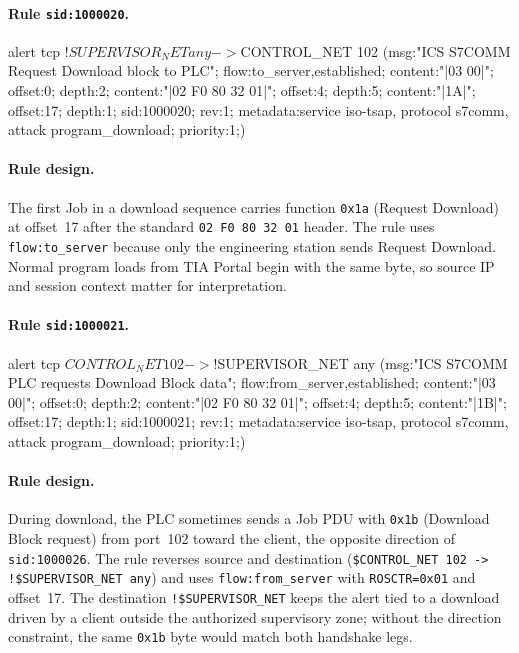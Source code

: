 \documentclass[../main.tex]{subfiles}
\begin{document}
\paragraph{Rule \texttt{sid:1000020}.}
\begin{packetdump}
alert tcp !$SUPERVISOR_NET any -> $CONTROL_NET 102 (msg:"ICS S7COMM Request Download block to PLC";
  flow:to_server,established; content:"|03 00|"; offset:0; depth:2;
  content:"|02 F0 80 32 01|"; offset:4; depth:5; content:"|1A|";
  offset:17; depth:1; sid:1000020; rev:1;
  metadata:service iso-tsap, protocol s7comm, attack program_download; priority:1;)
\end{packetdump}

\paragraph{Rule design.}
The first Job in a download sequence carries function \texttt{0x1a} (Request Download) at offset~17 after the standard \texttt{02 F0 80 32 01} header. The rule uses \texttt{flow:to\_server} because only the engineering station sends Request Download. Normal program loads from TIA Portal begin with the same byte, so source IP and session context matter for interpretation.

\paragraph{Rule \texttt{sid:1000021}.}
\begin{packetdump}
alert tcp $CONTROL_NET 102 -> !$SUPERVISOR_NET any (msg:"ICS S7COMM PLC requests Download Block data";
  flow:from_server,established; content:"|03 00|"; offset:0; depth:2;
  content:"|02 F0 80 32 01|"; offset:4; depth:5; content:"|1B|";
  offset:17; depth:1; sid:1000021; rev:1;
  metadata:service iso-tsap, protocol s7comm, attack program_download; priority:1;)
\end{packetdump}

\paragraph{Rule design.}
During download, the PLC sometimes sends a Job PDU with \texttt{0x1b} (Download Block request) from port~102 toward the client, the opposite direction of \texttt{sid:1000026}. The rule reverses source and destination (\texttt{\$CONTROL\_NET 102 -> !\$SUPERVISOR\_NET any}) and uses \texttt{flow:from\_server} with \texttt{ROSCTR=0x01} and offset~17. The destination \texttt{!\$SUPERVISOR\_NET} keeps the alert tied to a download driven by a client outside the authorized supervisory zone; without the direction constraint, the same \texttt{0x1b} byte would match both handshake legs.
\end{document}
